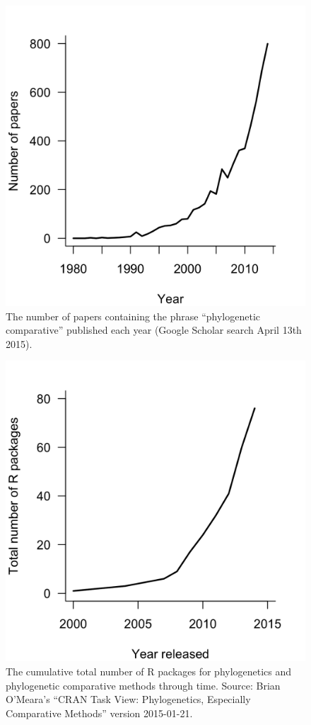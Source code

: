 \documentclass[a4paper,12pt]{article}
\begin{document}
  \begin{figure}[!htbp]
    \centering
      \includegraphics[width=12cm]{Figures/PCMCitations.png}
      \caption{The number of papers containing the phrase ``phylogenetic comparative'' published each year (Google Scholar search April 13th 2015).}
      \label{PCMCitations}
  \end{figure}

\newpage
  \begin{figure}[!htbp]
    \centering
      \includegraphics[width=12cm]{Figures/PCMRpackages.png}
      \caption{The cumulative total number of R packages for phylogenetics and phylogenetic comparative methods through time. Source: Brian O'Meara's ``CRAN Task View: Phylogenetics, Especially Comparative Methods'' version 2015-01-21.}
      \label{PCMRpackages}
  \end{figure}
\end{document}
